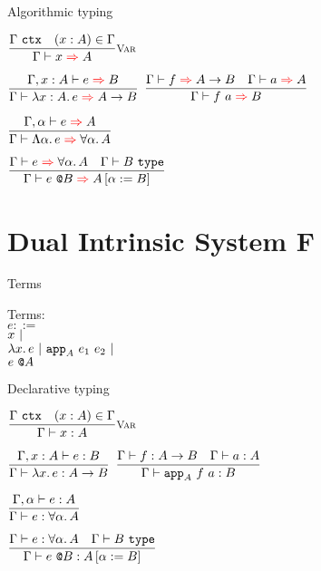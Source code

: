 \documentclass{beamer}
\begin{document}
\begin{frame}{Algorithmic typing}

\begin{center}
  $\infrule[Var]{\tyctx{\Gamma} \quad \sidecond{(x : A) \in \Gamma}}{\infer{x}{A}}$

  \vspace{2em}

  $\infrule{\fullinfer{\extend{\Gamma}{x}{A}}{e}{B}}{\infer{\ifun{x}{A}{e}}{\Fun{A}{B}}}$ \quad
  $\infrule{\infer{f}{\Fun{A}{B}} \quad \infer{a}{A}}{\infer{\app{f}{a}}{B}}$

  \vspace{2em}

  $\infrule{\fullinfer{\extendtype{\Gamma}{\alpha}}{e}{A}}{\infer{\tfun{\alpha}{e}}{\ForallT{\alpha}{A}}}$

  \vspace{2em}

  $\infrule{\infer{e}{\ForallT{\alpha}{A}} \quad \type{B}}{\infer{\tapp{e}{B}}{\subst{A}{\alpha}{B}}}$
\end{center}

\end{frame}

\section{Dual Intrinsic System F}

\begin{frame}{Terms}

Terms: \\
$e ::=$ \\
\qquad $x \pipe $ \\
\qquad $\fun{x}{e} \pipe \iapp{A}{e_1}{e_2} \pipe$ \\
\qquad $\tapp{e}{A}$

\end{frame}

\begin{frame}{Declarative typing}

\begin{center}
  $\infrule[Var]{\tyctx{\Gamma} \quad \sidecond{(x : A) \in \Gamma}}{\typing{x}{A}}$

  \vspace{2em}

  $\infrule{\fulltyping{\extend{\Gamma}{x}{A}}{e}{B}}{\typing{\fun{x}{e}}{\Fun{A}{B}}}$ \quad
  $\infrule{\typing{f}{\Fun{A}{B}} \quad \typing{a}{A}}{\typing{\iapp{A}{f}{a}}{B}}$

  \vspace{2em}

  $\infrule{\fulltyping{\extendtype{\Gamma}{\alpha}}{e}{A}}{\typing{e}{\ForallT{\alpha}{A}}}$

  \vspace{2em}

  $\infrule{\typing{e}{\ForallT{\alpha}{A}} \quad \type{B}}{\typing{\tapp{e}{B}}{\subst{A}{\alpha}{B}}}$
\end{center}

\end{frame}
\end{document}
